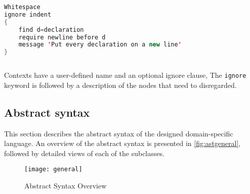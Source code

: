\begin{sourcecode}
\begin{lstlisting}[style=mono,language=Java]
Whitespace
ignore indent 
{
    find d=declaration
    require newline before d
    message 'Put every declaration on a new line'
}
\end{lstlisting}
\end{sourcecode}

Contexts have a user-defined name and an optional ignore clause, The \texttt{ignore} keyword is
followed by a description of the nodes that need to disregarded.

\subsection{Abstract syntax}

This section describes the abstract syntax of the designed domain-specific language. An overview of
the abstract syntax is presented in \autoref{fig:astgeneral}, followed by detailed views of each
of the subclasses.

\begin{figure}[h!]
  \centering
  \caption{Abstract Syntax Overview}
  \label{fig:astgeneral}
  \texttt{[image: general]}
\end{figure}


